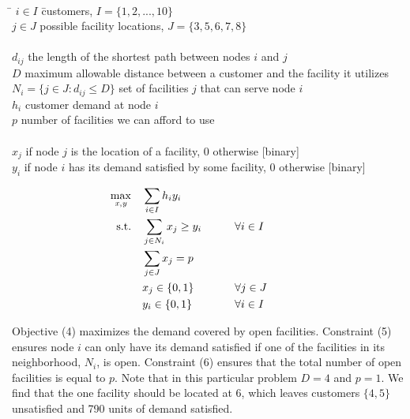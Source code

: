 \documentclass[10pt]{article}
\begin{document}
\begin{enumerate}
\begin{tabbing}
\\[0.2cm]
\hspace*{.5cm} \= $i\in I$ \hspace{2.8cm} \= customers, $I=\{1,2,...,10\}$ \\
\> $j\in J$ \> possible facility locations, $J=\{3,5,6,7,8\}$\\[0.2cm]
\\[0.2cm] 
\> $d_{ij}$ \> the length of the shortest path between nodes $i$ and $j$ \\
\> $D$ \> maximum allowable distance between a customer and the facility it utilizes\\
\> $N_i = \{ j \in J: d_{ij} \le D \}$ \> set of facilities $j$ that can serve node $i$ \\
\> $h_i$ \> customer demand at node $i$ \\
\> $p$  \> number of facilities we can afford to use\\[0.2cm]
\\
\> $x_j$  if node $j$ is the location of a facility, 0 otherwise  [binary] \\
\> $y_i$  if node $i$ has its demand satisfied by some facility, 0 otherwise  [binary] \\[0.2cm] 
\end{tabbing}
\begin{alignat}{3}
\max_{ \tiny{\it x, y}} \quad & \sum_{i\in I} h_i y_i \\
\mbox{s.t.} \quad & \sum_{j\in N_i} x_j \ge y_i &\qquad&  \forall i \in I &\qquad& \\
& \sum_{j \in J} x_j = p &&  \\
& x_j \in \{0,1\} && \forall j\in J \\
 & y_i \in \{0,1\} && \forall i\in I
\end{alignat}


Objective (4) maximizes the demand covered by open facilities.  Constraint (5) ensures node $i$ can only have its demand satisfied if one of the facilities in its neighborhood, $N_i$, is open.  Constraint (6) ensures that the total number of open facilities is equal to $p$.  Note that in this particular problem $D=4$ and $p=1$.  We find that the one facility should be located at 6, which leaves customers $\{4, 5\}$ unsatisfied and 790 units of demand satisfied.

\end{enumerate}

  
\end{document}
